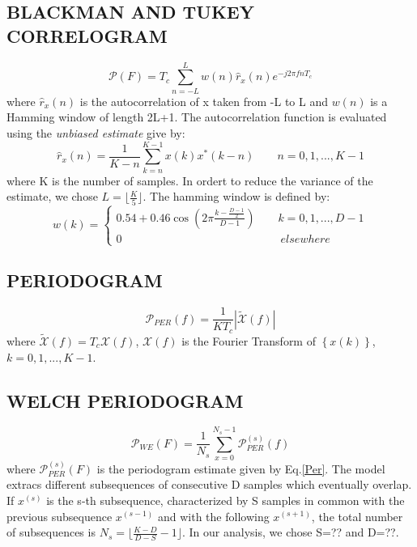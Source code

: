 \documentclass[a4paper,11pt,openright,twoside]{report}
\begin{document}
\subsection*{BLACKMAN AND TUKEY CORRELOGRAM}
\begin{equation}
\mathcal{P}(F) = T_c \sum_{n=-L}^{L} w(n)\hat{r}_x(n)e^{-j2\pi fnT_c}
\end{equation}
where $\hat{r}_x(n)$ is the autocorrelation of x taken from -L to L and $w(n)$ is a Hamming window of length 2L+1. The autocorrelation function is evaluated using the \textit{unbiased estimate} give by:
\begin{equation*}
\hat{r}_x(n) = \frac{1}{K-n}\sum_{k=n}^{K-1}x(k)x^*(k-n) \quad \quad n = 0,1,...,K-1
\end{equation*}
where K is the number of samples. In ordert to reduce the variance of the estimate, we chose $L=\lfloor \frac{K}{5} \rfloor$. The hamming window is defined by:
\begin{equation*}
w(k) = \begin{cases}
       0.54 + 0.46 \cos \left(2\pi \frac{k-\frac{D-1}{2}}{D-1} \right) \quad \quad k=0,1,...,D-1 \\
       0 \quad \quad \quad \quad \quad \quad \quad \quad \quad\quad \quad \quad \quad \quad elsewhere
       \end{cases}
\end{equation*} 


\subsection*{PERIODOGRAM}
\begin{equation}\label{Per}
\mathcal{P}_{PER}(f) = \frac{1}{KT_c} | \tilde{\mathcal{X}}(f) |
\end{equation}
where $\tilde{\mathcal{X}}(f) = T_c \mathcal{X}(f)$, $\mathcal{X}(f)$ is the Fourier Transform of $ \left\lbrace x(k) \right\rbrace$, $k = 0,1,...,K-1$.

\subsection*{WELCH PERIODOGRAM}
\begin{equation*}
\mathcal{P}_{WE}(F) = \frac{1}{N_s}\sum_{x=0}^{N_s-1}\mathcal{P}_{PER}^{(s)}(f)
\end{equation*}
where $\mathcal{P}_{PER}^{(s)}(F)$ is the periodogram estimate given by Eq.\ref{Per}.  
The model extracs different subsequences of consecutive D samples which eventually overlap. If $x^{(s)}$ is the s-th subsequence, characterized by S samples in common with the previous subsequence $x^{(s-1)}$ and with the following $x^{(s+1)}$, the total number of subsequences is $N_s = \lfloor \frac{K-D}{D-S}-1 \rfloor$. In our analysis, we chose S=?? and D=??. \\











	
	
\end{document}
